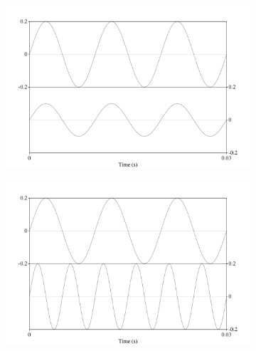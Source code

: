 \DIFaddbegin \begin{figure}[H]
\begin{subfigure}{0.5\textwidth}
  \includegraphics[width=\textwidth]{figure/basic-sound-amplitude.png}
  \caption{}
  \label{fig:basic-sound-amplitude}
\end{subfigure}
\qquad
\begin{subfigure}{0.5\textwidth}
  \includegraphics[width=\textwidth]{figure/basic-sound-frequency.png}
  \caption{}
  \label{fig:basic-sound-frequency}
\end{subfigure}
\\[2ex]
\begin{center}
\begin{subfigure}{0.5\textwidth}

\end{subfigure}
\end{center}
\end{figure}
